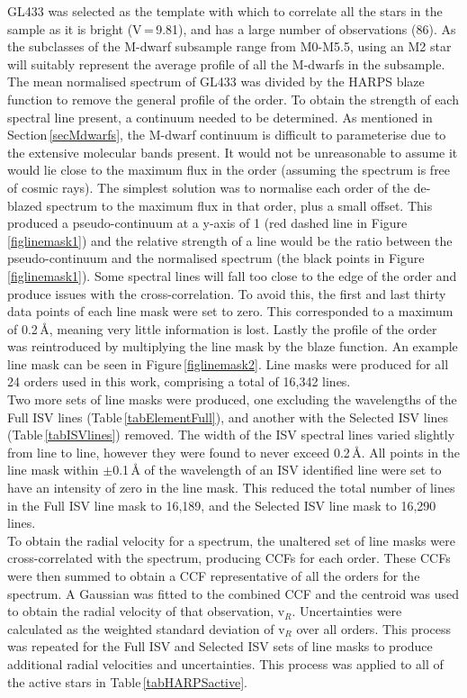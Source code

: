 GL433 was selected as the template with which to correlate all the stars in the sample as it is bright (V\,=\,9.81), and has a large number of observations (86). As the subclasses of the M-dwarf subsample range from M0-M5.5, using an M2 star will suitably represent the average profile of all the M-dwarfs in the subsample. The mean normalised spectrum of GL433 was divided by the HARPS blaze function to remove the general profile of the order. To obtain the strength of each spectral line present, a continuum needed to be determined. As mentioned in Section\,\ref{secMdwarfs}, the M-dwarf continuum is difficult to parameterise due to the extensive molecular bands present. It would not be unreasonable to assume it would lie close to the maximum flux in the order (assuming the spectrum is free of cosmic rays). The simplest solution was to normalise each order of the de-blazed spectrum to the maximum flux in that order, plus a small offset. This produced a pseudo-continuum at a y-axis of 1 (red dashed line in Figure\,\ref{figlinemask1}) and the relative strength of a line would be the ratio between the pseudo-continuum and the normalised spectrum (the black points in Figure\,\ref{figlinemask1}). Some spectral lines will fall too close to the edge of the order and produce issues with the cross-correlation. To avoid this, the first and last thirty data points of each line mask were set to zero. This corresponded to a maximum of 0.2\,\hbox{\AA}, meaning very little information is lost. Lastly the profile of the order was reintroduced by multiplying the line mask by the blaze function. An example line mask can be seen in Figure\,\ref{figlinemask2}. Line masks were produced for all 24 orders used in this work, comprising a total of 16,342 lines.\\

Two more sets of line masks were produced, one excluding the wavelengths of the Full ISV lines (Table\,\ref{tabElementFull}), and another with the Selected ISV lines (Table\,\ref{tabISVlines}) removed. The width of the ISV spectral lines varied slightly from line to line, however they were found to never exceed 0.2\,\AA. All points in the line mask within $\pm$0.1\,\hbox{\AA} of the wavelength of an ISV identified line were set to have an intensity of zero in the line mask. This reduced the total number of lines in the Full ISV line mask to 16,189, and the Selected ISV line mask to 16,290 lines.\\

To obtain the radial velocity for a spectrum, the unaltered set of line masks were cross-correlated with the spectrum, producing CCFs for each order. These CCFs were then summed to obtain a CCF representative of all the orders for the spectrum. A Gaussian was fitted to the combined CCF and the centroid was used to obtain the radial velocity of that observation, v$_{R}$. Uncertainties were calculated as the weighted standard deviation of v$_{R}$ over all orders. This process was repeated for the Full ISV and Selected ISV sets of line masks to produce additional radial velocities and uncertainties. This process was applied to all of the active stars in Table\,\ref{tabHARPSactive}.\\

